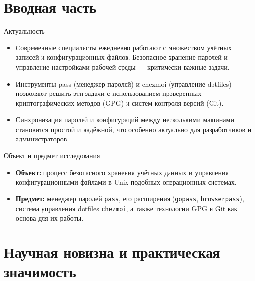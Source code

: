 \documentclass[
  ignorenonframetext,
  aspectratio=169,
  russian,
  aspectratio=169]{beamer}
\providecommand{\tightlist}{%
  \setlength{\itemsep}{0pt}\setlength{\parskip}{0pt}}
\begin{document}
\section{Вводная
часть}\label{ux432ux432ux43eux434ux43dux430ux44f-ux447ux430ux441ux442ux44c}

\begin{frame}{Актуальность}
\protect{}\label{ux430ux43aux442ux443ux430ux43bux44cux43dux43eux441ux442ux44c}
\begin{itemize}[<+->]
\tightlist
\item
  Современные специалисты ежедневно работают с множеством учётных
  записей и конфигурационных файлов. Безопасное хранение паролей и
  управление настройками рабочей среды --- критически важные задачи.
\item
  Инструменты pass (менеджер паролей) и chezmoi (управление dotfiles)
  позволяют решить эти задачи с использованием проверенных
  криптографических методов (GPG) и систем контроля версий (Git).
\item
  Синхронизация паролей и конфигураций между несколькими машинами
  становится простой и надёжной, что особенно актуально для
  разработчиков и администраторов.
\end{itemize}
\end{frame}

\begin{frame}[fragile]{Объект и предмет исследования}
\protect{}\label{ux43eux431ux44aux435ux43aux442-ux438-ux43fux440ux435ux434ux43cux435ux442-ux438ux441ux441ux43bux435ux434ux43eux432ux430ux43dux438ux44f}
\begin{itemize}[<+->]
\tightlist
\item
  \textbf{Объект:} процесс безопасного хранения учётных данных и
  управления конфигурационными файлами в Unix-подобных операционных
  системах.
\item
  \textbf{Предмет:} менеджер паролей \texttt{pass}, его расширения
  (\texttt{gopass}, \texttt{browserpass}), система управления dotfiles
  \texttt{chezmoi}, а также технологии GPG и Git как основа для их
  работы.
\end{itemize}
\end{frame}

\section{Научная новизна и практическая
значимость}\label{ux43dux430ux443ux447ux43dux430ux44f-ux43dux43eux432ux438ux437ux43dux430-ux438-ux43fux440ux430ux43aux442ux438ux447ux435ux441ux43aux430ux44f-ux437ux43dux430ux447ux438ux43cux43eux441ux442ux44c}
\end{document}
